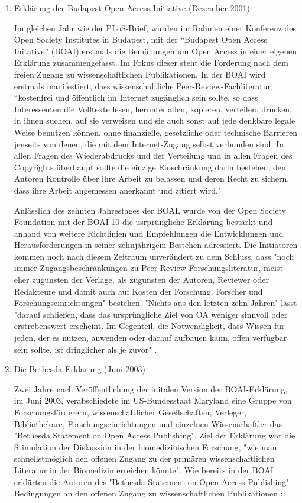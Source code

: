 \begin{enumerate}
\item Erklärung der Budapest Open Access Initiative (Dezember 2001)

Im gleichen Jahr wie der PLoS-Brief, wurden im Rahmen einer Konferenz des Open Society Institutes in Budapest, mit der “Budapest Open Access Initative” (BOAI)\cite{boai_2012} erstmals die Bemühungen um Open Access in einer eigenen Erklärung zusammengefasst\cite{cite:21a}. Im Fokus dieser steht die Forderung nach dem freien Zugang zu wissenschaftlichen Publikationen. In der BOAI wird erstmals manifestiert, dass wissenschaftliche Peer-Review-Fachliteratur “kostenfrei und öffentlich im Internet zugänglich sein sollte, so dass Interessenten die Volltexte lesen, herunterladen, kopieren, verteilen, drucken, in ihnen suchen, auf sie verweisen und sie auch sonst auf jede denkbare legale Weise benutzen können, ohne finanzielle, gesetzliche oder technische Barrieren jenseits von denen, die mit dem Internet-Zugang selbst verbunden sind. In allen Fragen des Wiederabdrucks und der Verteilung und in allen Fragen des Copyrights überhaupt sollte die einzige Einschränkung darin bestehen, den Autoren Kontrolle über ihre Arbeit zu belassen und deren Recht zu sichern, dass ihre Arbeit angemessen anerkannt und zitiert wird."\cite{boai_2012} 

Anlässlich des zehnten Jahrestages der BOAI, wurde von der Open Society Foundation mit der BOAI 10 die usrprüngliche Erklärung bestärkt und anhand von weitere Richtlinien und Empfehlungen die Entwicklungen und Herausforderungen in seiner zehnjährigem Bestehen adressiert. Die Initiatoren kommen noch nach diesem Zeitraum unverändert zu dem Schluss, dass "noch immer Zugangsbeschränkungen zu Peer-Review-Forschungsliteratur, meist eher zugunsten der Verlage, als zugunsten der Autoren, Reviewer oder Redakteure und damit auch auf Kosten der Forschung, Forscher und Forschungseinrichtungen" \cite{boai_2012} bestehen. "Nichts aus den letzten zehn Jahren" lässt "darauf schließen, dass das ursprüngliche Ziel von OA weniger sinnvoll oder erstrebenswert erscheint. Im Gegenteil, die Notwendigkeit, dass Wissen für jeden, der es nutzen, anwenden oder darauf aufbauen kann, offen verfügbar sein sollte, ist dringlicher als je zuvor" \cite{boai_2012}.

\item Die Bethesda Erklärung (Juni 2003)

Zwei Jahre nach Veröffentlichung der initalen Version der BOAI-Erklärung, im Juni 2003, verabschiedete im US-Bundesstaat Maryland eine Gruppe von Forschungsförderern, wissenschaftlicher Gesellschaften, Verleger, Bibliothekare, Forschungseinrichtungen und einzelnen Wissenschaftler das "Bethesda Statement on Open Access Publishing".\cite{suchen} Ziel der Erklärung war die Stimulation der Diskussion in der biomedizinischen Forschung, "wie man schnellstmöglich den offenen Zugang zu der primären wissenschaftlichen Literatur in der Biomedizin erreichen könnte"\cite{suchen}. Wie bereits in der BOAI erklärten die Autoren des "Bethesda Statement on Open Access Publishing" Bedingungen an den offenen Zugang zu wissenschaftlichen Publikationen \cite{suchen}: 


\end{enumerate}
